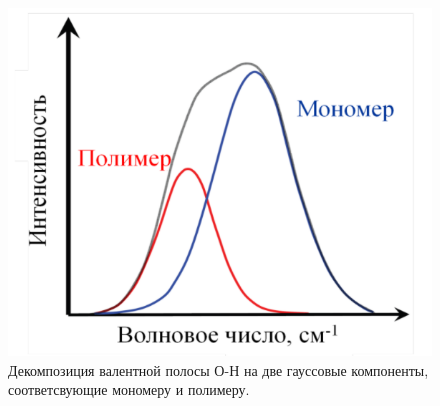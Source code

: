 \documentclass[a4paper,12pt]{article} %
\begin{document}
\begin{figure}[h!]
    \centering
    \includegraphics[scale=0.6]{пики.png}
    \caption{Декомпозиция валентной
полосы О-Н на две гауссовые компоненты, соответсвующие мономеру и полимеру.}
    \label{Ber}
\end{figure}
\end{document}
